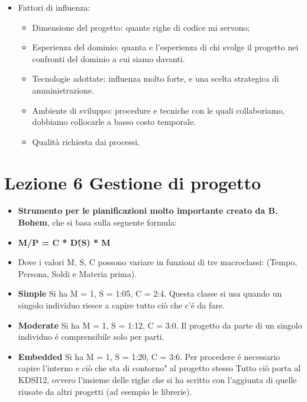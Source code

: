 \documentclass[a4paper,10pt] {article}
\begin{document}
\begin{itemize}
\begin{itemize}
\begin{itemize}
\item Fattori di influenza:
\begin{itemize}
	
	\item Dimensione del progetto: quante righe di codice mi servono; 
	
    \item Esperienza del dominio: quanta e l'esperienza di chi svolge il 
    progetto nei confronti del dominio a cui siamo davanti.
    
	\item Tecnologie adottate: influenza molto forte, e una scelta strategica 
	di amministrazione.
	
	\item Ambiente di sviluppo: procedure e tecniche con le quali collaboriamo, 
	dobbiamo collocarle a basso costo temporale.

 	\item Qualità richiesta dai processi.
 	
\end{itemize}
\end{itemize}
\end{itemize}

\section{Lezione 6 Gestione di progetto}

\begin{itemize}
\item \textbf{Strumento per le pianificazioni molto importante creato da B. 
Bohem}, che si basa sulla seguente formula:

	\item \textbf{M/P = C * D\^(S) * M}

\item Dove i valori M, S, C possono variare in funzioni di tre macroclassi:
(Tempo, Persona, Soldi e Materia prima).

\item \textbf{Simple} Si ha M = 1, S = 1:05, C = 2:4. Questa classe si usa 
quando un singolo individuo riesce a capire tutto ciò che c'é da fare.


\item \textbf{Moderate} Si ha M = 1, S = 1:12, C = 3:0. Il progetto da parte di
un singolo individuo é comprensibile solo per parti.

\item \textbf{Embedded} Si ha M = 1, S = 1:20, C = 3:6. Per procedere é
necessario capire l'interno e ciò che sta di contorno" al progetto stesso
Tutto ciò porta al KDSI12, ovvero l'insieme delle righe che si ha scritto
con l'aggiunta di quelle riusate da altri progetti (ad esempio le librerie).
\end{itemize}


\end{itemize}
\end{document}
